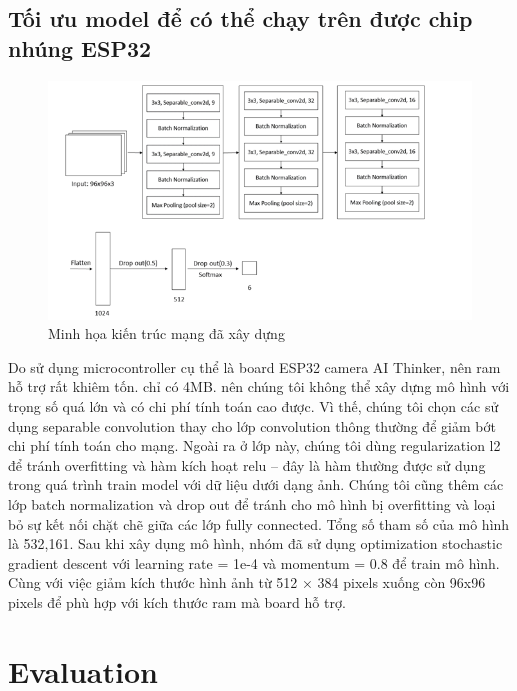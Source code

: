 \subsection{Tối ưu model để có thể chạy trên được chip nhúng ESP32}
\begin{figure}[ht]
    \centering
    \includegraphics[width=\linewidth]{images/Quanh/ktmang.png}
    \caption{ Minh họa kiến trúc mạng đã xây dựng}
    \label{fig:kientrucmang}
\end{figure}

Do sử dụng microcontroller cụ thể là board ESP32 camera AI Thinker, nên ram hỗ trợ rất khiêm tốn. chỉ có 4MB. nên chúng tôi không thể xây dựng mô hình với trọng số quá lớn và có chi phí tính toán cao được. Vì thế, chúng tôi chọn các sử dụng separable convolution thay cho lớp convolution thông thường để giảm bớt chi phí tính toán cho mạng. Ngoài ra ở lớp này, chúng tôi dùng regularization l2 để tránh overfitting và hàm kích hoạt relu – đây là hàm thường được sử dụng trong quá trình train model với dữ liệu dưới dạng ảnh. Chúng tôi cũng thêm các lớp batch normalization và drop out để tránh cho mô hình bị overfitting và loại bỏ sự kết nối chặt chẽ giữa các lớp fully connected. Tổng số tham số của mô hình là 532,161. Sau khi xây dụng mô hình, nhóm đã sử dụng optimization stochastic gradient descent với learning rate = 1e-4 và momentum = 0.8 để train mô hình. Cùng với việc giảm kích thước hình ảnh từ 512 × 384 pixels xuống còn 96x96 pixels để phù hợp với kích thước ram mà board hỗ trợ.

\section{Evaluation}
